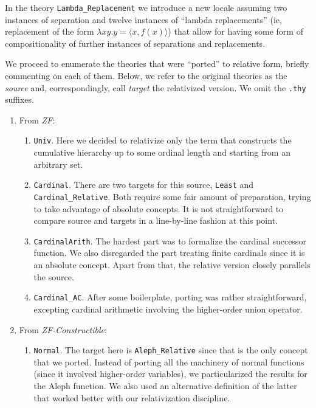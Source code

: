 \documentclass[11pt,a4paper]{article}
\newcommand{\session}[1]{\textit{#1}}
\newcommand{\theory}[1]{\texttt{#1}}
\begin{document}
In the theory \theory{Lambda\_Replacement} we introduce a new locale assuming
two instances of separation and twelve instances of ``lambda replacements''
(ie, replacement of the form $\lambda x y. y=\langle x, f(x) \rangle$)
that allow for having some form of compositionality of further instances
of separations and replacements.

We proceed to enumerate the theories that were ``ported'' to relative
form, briefly commenting on each of them. Below, we refer to the
original theories as the \emph{source} and, correspondingly, call
\emph{target} the relativized version. We omit the \theory{.thy}
suffixes.

\begin{enumerate}
\item From \session{ZF}:
  \begin{enumerate}
  \item \theory{Univ}. Here we decided to relativize only the term
     that constructs the cumulative hierarchy up to some
    ordinal length and starting from an arbitrary set.
  \item \theory{Cardinal}. There are two targets for this source,
    \theory{Least} and \theory{Cardinal\_Relative}. Both require some
    fair amount of preparation, trying to take advantage of absolute
    concepts. It is not straightforward to compare source and targets
    in a line-by-line fashion at this point.
  \item \theory{CardinalArith}. The hardest part was to formalize the
    cardinal successor function. We also disregarded the part treating
    finite cardinals since it is an absolute concept. Apart from that,
    the relative version closely parallels the source.
  \item \theory{Cardinal\_AC}. After some boilerplate, porting was
    rather straightforward, excepting cardinal arithmetic involving
    the higher-order union operator.
  \end{enumerate}
\item From \session{ZF-Constructible}:
  \begin{enumerate}
  \item \theory{Normal}. The target here is \theory{Aleph\_Relative}
    since that is the only concept that we ported. Instead of porting
    all the machinery of normal functions (since it involved
    higher-order variables), we particularized the results for the
    Aleph function. We also used an alternative definition of the
    latter that worked better with our relativization discipline.

\end{enumerate}
\end{enumerate}
\end{document}

